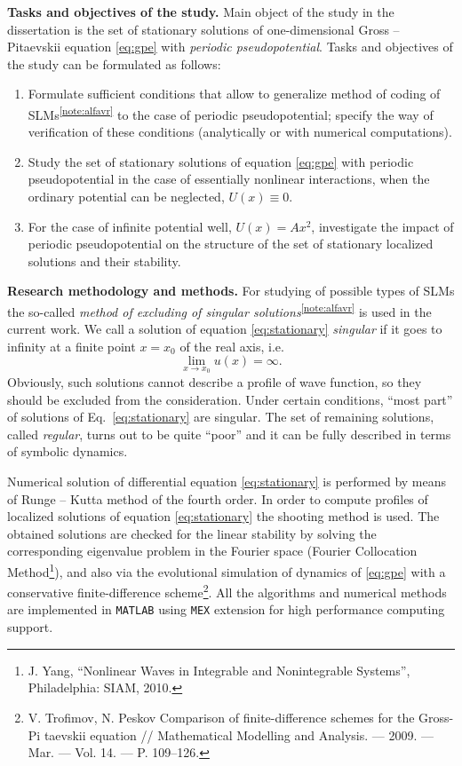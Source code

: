 \documentclass[candidate, href, colorlinks]{disser}
\begin{document}
\textbf{Tasks and objectives of the study.}
Main object of the study in the dissertation is the set of stationary solutions of one-dimensional Gross -- Pitaevskii equation \eqref{eq:gpe} with {\it periodic pseudopotential}.
Tasks and objectives of the study can be formulated as follows:
\begin{enumerate}
	\item Formulate sufficient conditions that allow to generalize method of coding of SLMs\textsuperscript{\ref{note:alfavr}} to the case of periodic pseudopotential; specify the way of verification of these conditions (analytically or with numerical computations).
	\item Study the set of stationary solutions of equation \eqref{eq:gpe} with periodic pseudopotential in the case of essentially nonlinear interactions, when the ordinary potential can be neglected, $U(x) \equiv 0$.
	\item For the case of infinite potential well, $U(x) = A x^2$, investigate the impact of periodic pseudopotential on the structure of the set of stationary localized solutions and their stability.
\end{enumerate}

\textbf{Research methodology and methods.}
For studying of possible types of SLMs the so-called {\it method of excluding of singular solutions}\textsuperscript{\ref{note:alfavr}} is used in the current work.
We call a solution of equation \eqref{eq:stationary} {\it singular} if it goes to infinity at a finite point $x = x_0$ of the real axis, i.e.
\begin{equation}
	\lim \limits_{x \to x_0} u(x) = \infty.
\end{equation}
Obviously, such solutions cannot describe a profile of wave function, so they should be excluded from the consideration.
Under certain conditions, ``most part'' of solutions of Eq.~\eqref{eq:stationary} are singular.
The set of remaining solutions, called {\it regular}, turns out to be quite ``poor'' and it can be fully described in terms of symbolic dynamics.

Numerical solution of differential equation \eqref{eq:stationary} is performed by means of Runge -- Kutta method of the fourth order.
In order to compute profiles of localized solutions of equation \eqref{eq:stationary} the shooting method is used.
The obtained solutions are checked for the linear stability by solving the corresponding eigenvalue problem in the Fourier space (Fourier Collocation Method\footnote{J. Yang, ``Nonlinear Waves in Integrable and Nonintegrable Systems'', Philadelphia: SIAM, 2010.}), and also via the evolutional simulation of dynamics of \eqref{eq:gpe} with a conservative finite-difference scheme\footnote{V. Trofimov, N. Peskov Comparison of finite-difference schemes for the Gross-Pi­ taevskii equation // Mathematical Modelling and Analysis. — 2009. — Mar. — Vol. 14. — P. 109–126.}.
All the algorithms and numerical methods are implemented in {\tt MATLAB} using {\tt MEX} extension for high performance computing support.
\end{document}
